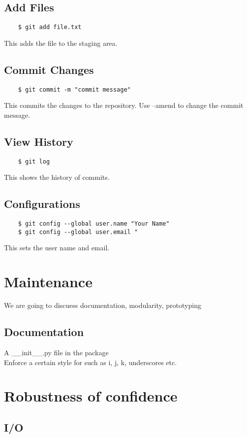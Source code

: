 \documentclass[12pt,a4paper]{article}
\begin{document}
\subsection{Add Files}
\begin{lstlisting}
    $ git add file.txt
\end{lstlisting}
This adds the file to the staging area.\\
\subsection{Commit Changes}
\begin{lstlisting}
    $ git commit -m "commit message"
\end{lstlisting}
This commits the changes to the repository. Use --amend to change the commit message.\\
\subsection{View History}
\begin{lstlisting}
    $ git log
\end{lstlisting}
This shows the history of commits.\\
\subsection{Configurations}
\begin{lstlisting}
    $ git config --global user.name "Your Name"
    $ git config --global user.email "
\end{lstlisting}
This sets the user name and email.\\


\section{Maintenance}
We are going to discuess documentation, modularity, prototyping
\subsection{Documentation}
    A \_\_init\_\_.py file in the package\\
    Enforce a certain style for such as i, j, k, underscores etc.

\section{Robustness of confidence}
\subsection{I/O}
\end{document}
